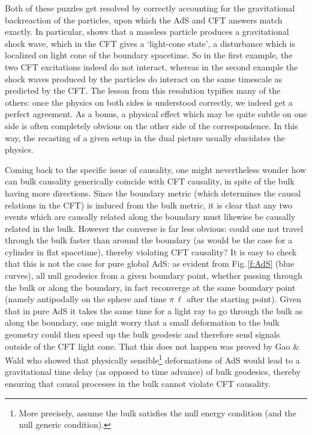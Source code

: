\documentclass[12pt]{article}
\def\fig#1{Fig.\,\ref{#1}}
\def\Rads{\ell}
\begin{document}
Both of these puzzles get resolved by correctly accounting for the gravitational backreaction of the particles, upon which the AdS and CFT answers match exactly.  In particular, \cite{Horowitz:1999gf} shows that a massless particle produces a gravitational shock wave, which in the CFT
gives a `light-cone state', a disturbance which is localized on light cone of the boundary spacetime.  
So in the first example, the two CFT excitations indeed do not interact, whereas in the second example the shock waves produced by the particles do interact on the same timescale as predicted by the CFT.
The lesson from this resolution typifies many of the others: once the physics on both sides is understood correctly, we indeed get a perfect agreement.  As a bonus, a physical effect which may be quite subtle on one side is often completely obvious on the other side of the correspondence.   In this way, the recasting of a given setup in the dual picture usually elucidates the physics.

Coming back to the specific issue of causality, one might nevertheless wonder how can bulk causality generically coincide with CFT causality, in spite of  the bulk having more directions.
Since the boundary metric (which determines the causal relations in the CFT) is induced from the bulk metric, it is clear that any two events which are causally related along the boundary must likewise be causally related in the bulk.  However the converse is far less obvious:  could one not travel through the bulk faster than around the boundary (as would be the case for a cylinder in flat spacetime), thereby violating CFT causality?  It is easy to check that this is not the case for pure global AdS: as evident from \fig{f:AdS} (blue curves), all null geodesics from a given boundary point, whether passing through the bulk or along the boundary,  in fact reconverge at the same boundary point (namely antipodally on the sphere and time $\pi \, \Rads$ after the starting point). 
Given that in pure AdS it takes the same time for a light ray to go through the bulk as along the boundary, one might worry that a small deformation to the bulk geometry could then speed up the bulk geodesic and therefore send signals outside of the CFT light cone.
That this does not happen was proved by Gao \& Wald \cite{Gao:2000ga} who showed that physically sensible\footnote{
More precisely, \cite{Gao:2000ga} assume the bulk satisfies the null energy condition (and the null generic condition).
} deformations of AdS would lead to a gravitational time delay (as opposed to time advance) of bulk geodesics, thereby ensuring that causal processes in the bulk cannot violate CFT causality.
\end{document}

